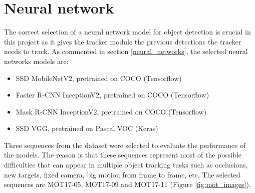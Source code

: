 \section{Neural network}
The correct selection of a neural network model for object detection is crucial in this project as it gives the tracker module the previous detections the tracker needs to track. As commented in section \ref{neural_networks}, the selected neural networks models are:
\begin{itemize}
    \item SSD MobileNetV2, pretrained on COCO (Tensorflow)
    \item Faster R-CNN InceptionV2, pretrained on COCO (Tensorflow)
    \item Mask R-CNN InceptionV2, pretrained on COCO (Tensorflow)
    \item SSD VGG, pretrained on Pascal VOC (Keras)
\end{itemize}
Three sequences from the dataset were selected to evaluate the performance of the models. The reason is that these sequences represent most of the possible difficulties that can appear in multiple object tracking tasks such as occlusions, new targets, fixed camera, big motion from frame to frame, etc. The selected sequences are MOT17-05, MOT17-09 and MOT17-11 (Figure \ref{fig:mot_images})\label{selected_sequences}.\\
